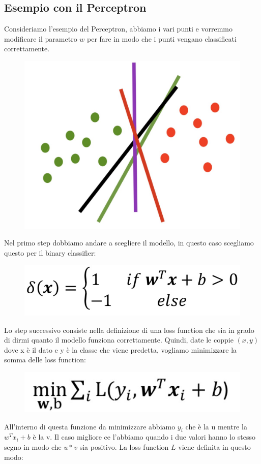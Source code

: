 \documentclass[14pt]{extreport}
\begin{document}
\subsection{Esempio con il Perceptron}

Consideriamo l'esempio del Perceptron, abbiamo i vari punti e vorremmo modificare il parametro $w$ per fare in modo che i punti vengano classificati
correttamente.

\begin{figure}[H]
	\centering
	\includegraphics[width=0.5\linewidth]{265.jpeg}
\end{figure}

Nel primo step dobbiamo andare a scegliere il modello, in questo caso scegliamo questo per il binary classifier:

\begin{figure}[H]
	\centering
	\includegraphics[width=0.5\linewidth]{264.jpeg}
\end{figure}


Lo step successivo consiste nella definizione di una loss function che sia in grado di dirmi quanto il modello funziona correttamente. Quindi, date le
coppie $(x,y)$ dove x è il dato e y è la classe che viene predetta, vogliamo minimizzare la somma delle loss function:
\begin{figure}[H]
	\centering
	\includegraphics[width=0.5\linewidth]{266.jpeg}
\end{figure}

All'interno di questa funzione da minimizzare abbiamo $y_i$ che è la u mentre la $w^Tx_i + b$ è la v. Il caso migliore ce l'abbiamo quando i due
valori hanno lo stesso segno in modo che $u*v$ sia positivo. La loss function $L$ viene definita in questo modo:
\end{document}
